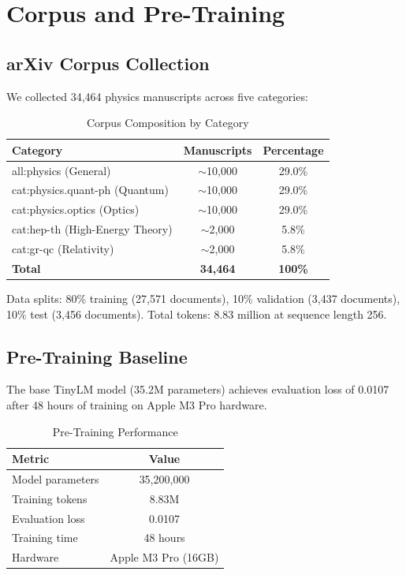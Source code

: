 \documentclass[11pt,a4paper]{article}
\theoremstyle{plain}
\theoremstyle{definition}
\begin{document}
\section{Corpus and Pre-Training}

\subsection{arXiv Corpus Collection}

We collected 34,464 physics manuscripts across five categories:

\begin{table}[H]
\centering
\caption{Corpus Composition by Category}
\begin{tabular}{lcc}
\toprule
\textbf{Category} & \textbf{Manuscripts} & \textbf{Percentage} \\
\midrule
all:physics (General) & $\sim$10,000 & 29.0\% \\
cat:physics.quant-ph (Quantum) & $\sim$10,000 & 29.0\% \\
cat:physics.optics (Optics) & $\sim$10,000 & 29.0\% \\
cat:hep-th (High-Energy Theory) & $\sim$2,000 & 5.8\% \\
cat:gr-qc (Relativity) & $\sim$2,000 & 5.8\% \\
\midrule
\textbf{Total} & \textbf{34,464} & \textbf{100\%} \\
\bottomrule
\end{tabular}
\end{table}

Data splits: 80\% training (27,571 documents), 10\% validation
(3,437 documents), 10\% test (3,456 documents). Total tokens:
8.83 million at sequence length 256.

\subsection{Pre-Training Baseline}

The base TinyLM model (35.2M parameters) achieves evaluation loss
of 0.0107 after 48 hours of training on Apple M3 Pro hardware.

\begin{table}[H]
\centering
\caption{Pre-Training Performance}
\begin{tabular}{lc}
\toprule
\textbf{Metric} & \textbf{Value} \\
\midrule
Model parameters & 35,200,000 \\
Training tokens & 8.83M \\
Evaluation loss & 0.0107 \\
Training time & 48 hours \\
Hardware & Apple M3 Pro (16GB) \\
\bottomrule
\end{tabular}
\end{table}
\end{document}
